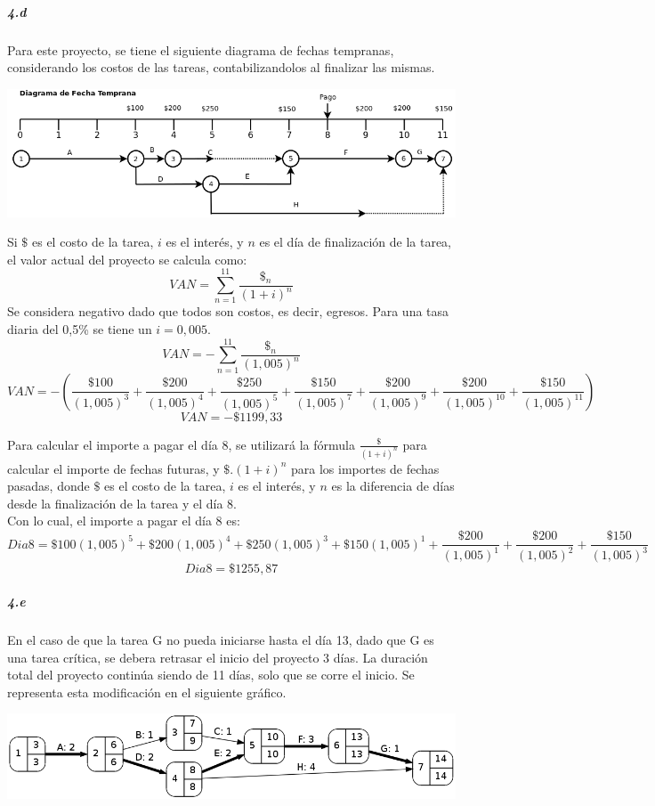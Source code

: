 \documentclass[a4paper,10pt]{article}
\begin{document}
  \subparagraph {4.d} Para este proyecto, se tiene el siguiente diagrama de fechas tempranas, considerando los costos de las tareas, contabilizandolos al finalizar las mismas. 
    \begin{center}
    \includegraphics[scale=0.55,keepaspectratio=true]{img/ej4-fechatemprana.png} 
  \end{center}
  Si $ \$$ es el costo de la tarea, $i$ es el interés, y $n$ es el día de finalización de la tarea, el valor actual del proyecto se calcula como:
  $$VAN = \sum _{n=1}^{11} {\frac{\$_n}{(1+i)^n}}$$
  Se considera negativo dado que todos son costos, es decir, egresos. Para una tasa diaria del 0,5\% se tiene un $i=0,005$.
  $$VAN = - \sum _{n=1}^{11} {\frac{\$_n}{(1,005)^n}}$$
  $$VAN = - \left( \frac{\$100}{(1,005)^3} + \frac{\$200}{(1,005)^4} + \frac{\$250}{(1,005)^5} + \frac{\$150}{(1,005)^7} + \frac{\$200}{(1,005)^9} + \frac{\$200}{(1,005)^{10}} + \frac{\$150}{(1,005)^{11}}\right)$$
  $$VAN = -\$1199,33$$
  
  Para calcular el importe a pagar el día 8, se utilizará la fórmula $\frac{\$}{(1+i)^n} $ para calcular el importe de fechas futuras, y $ \$ . (1+i)^n $ para los importes de fechas pasadas,
  donde $ \$$ es el costo de la tarea, $i$ es el interés, y $n$ es la diferencia de días desde la finalización de la tarea y el día 8.\\
    Con lo cual, el importe a pagar el día 8 es: 
  $$Dia 8 = \$100(1,005)^5 + \$200 (1,005)^4 + \$250(1,005)^3 + \$150(1,005)^1 + \frac{\$200}{(1,005)^1} + \frac{\$200}{(1,005)^2} + \frac{\$150}{(1,005)^3} $$
  $$Dia 8 = \$ 1255,87$$
  
  \subparagraph {4.e} En el caso de que la tarea G no pueda iniciarse hasta el día 13, dado que G es una tarea crítica, se debera retrasar el inicio del proyecto 3 días. 
  La duración total del proyecto continúa siendo de 11 días, solo que se corre el inicio. Se representa esta modificación en el siguiente gráfico.
  \begin{center}
    \includegraphics[scale=0.5,keepaspectratio=true]{img/ej4-e.png} 
  \end{center}
  
\end{document}
